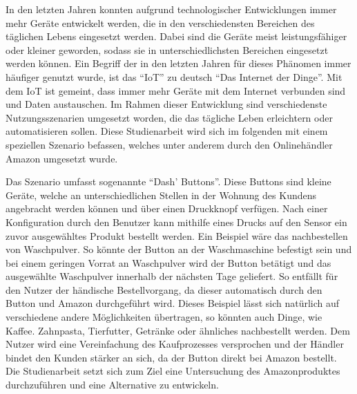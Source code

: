 In den letzten Jahren konnten aufgrund technologischer Entwicklungen immer mehr Geräte entwickelt werden, die in den verschiedensten Bereichen des täglichen Lebens eingesetzt werden. Dabei sind die Geräte meist leistungsfähiger oder kleiner geworden, sodass sie in unterschiedlichsten Bereichen eingesetzt werden können. Ein Begriff der in den letzten Jahren für dieses Phänomen immer häufiger genutzt wurde, ist das ``\ac{IoT}'' zu deutsch ``Das Internet der Dinge''. Mit dem \ac{IoT} ist gemeint, dass immer mehr Geräte mit dem Internet verbunden sind und Daten austauschen. Im Rahmen dieser Entwicklung sind verschiedenste Nutzungsszenarien umgesetzt worden, die das tägliche Leben erleichtern oder automatisieren sollen. Diese Studienarbeit wird sich im folgenden mit einem speziellen Szenario befassen, welches unter anderem durch den Onlinehändler Amazon umgesetzt wurde.

Das Szenario umfasst sogenannte ``Dash' Buttons''. Diese Buttons sind kleine Geräte, welche an unterschiedlichen Stellen in der Wohnung des Kundens angebracht werden können und über einen Druckknopf verfügen. Nach einer Konfiguration durch den Benutzer kann mithilfe eines Drucks auf den Sensor ein zuvor ausgewähltes Produkt bestellt werden. Ein Beispiel wäre das nachbestellen von Waschpulver. So könnte der Button an der Waschmaschine befestigt sein und bei einem geringen Vorrat an Waschpulver wird der Button betätigt und das ausgewählte Waschpulver innerhalb der nächsten Tage geliefert. So entfällt für den Nutzer der händische Bestellvorgang, da dieser automatisch durch den Button und Amazon durchgeführt wird. Dieses Beispiel lässt sich natürlich auf verschiedene andere Möglichkeiten übertragen, so könnten auch Dinge, wie Kaffee. Zahnpasta, Tierfutter, Getränke oder ähnliches nachbestellt werden. Dem Nutzer wird eine Vereinfachung des Kaufprozesses versprochen und der Händler bindet den Kunden stärker an sich, da der Button direkt bei Amazon bestellt. 
Die Studienarbeit setzt sich zum Ziel eine Untersuchung des Amazonproduktes durchzuführen und eine Alternative zu entwickeln. 